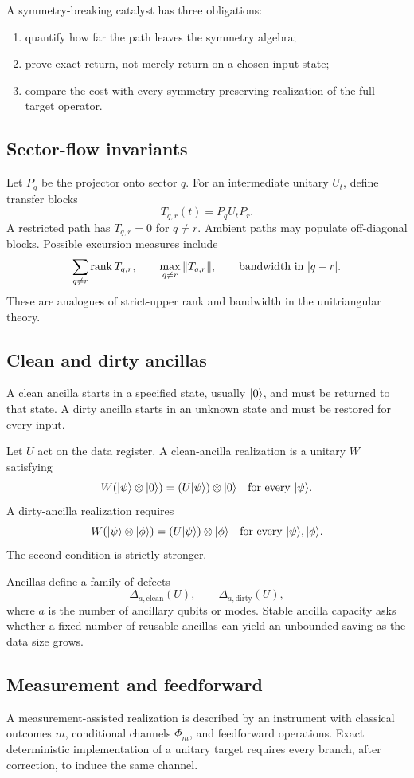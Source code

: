 \begin{skeletonbox}
A symmetry-breaking catalyst has three obligations:
\begin{enumerate}
\item quantify how far the path leaves the symmetry algebra;
\item prove exact return, not merely return on a chosen input state;
\item compare the cost with every symmetry-preserving realization of the full target operator.
\end{enumerate}
\end{skeletonbox}

\subsection{Sector-flow invariants}
Let $P_q$ be the projector onto sector $q$.  For an intermediate unitary $U_t$, define transfer blocks
\[
T_{q,r}(t)=P_q U_t P_r.
\]
A restricted path has $T_{q,r}=0$ for $q\ne r$.  Ambient paths may populate off-diagonal blocks.  Possible excursion measures include
\[
\sum_{q\ne r}\operatorname{rank} T_{q,r},
\qquad
\max_{q\ne r}\|T_{q,r}\|,
\qquad
\text{bandwidth in }|q-r|.
\]
These are analogues of strict-upper rank and bandwidth in the unitriangular theory.

\subsection{Clean and dirty ancillas}
A clean ancilla starts in a specified state, usually $\lvert 0\rangle$, and must be returned to that state.  A dirty ancilla starts in an unknown state and must be restored for every input.

Let $U$ act on the data register.  A clean-ancilla realization is a unitary $W$ satisfying
\[
W(\lvert \psi\rangle\otimes\lvert 0\rangle)
=(U\lvert \psi\rangle)\otimes\lvert 0\rangle
\quad\text{for every }\lvert \psi\rangle.
\]
A dirty-ancilla realization requires
\[
W(\lvert \psi\rangle\otimes\lvert \phi\rangle)
=(U\lvert \psi\rangle)\otimes\lvert \phi\rangle
\quad\text{for every }\lvert \psi\rangle,\lvert \phi\rangle.
\]
The second condition is strictly stronger.

Ancillas define a family of defects
\[
\Delta_{a,\mathrm{clean}}(U),
\qquad
\Delta_{a,\mathrm{dirty}}(U),
\]
where $a$ is the number of ancillary qubits or modes.  Stable ancilla capacity asks whether a fixed number of reusable ancillas can yield an unbounded saving as the data size grows.

\subsection{Measurement and feedforward}
A measurement-assisted realization is described by an instrument with classical outcomes $m$, conditional channels $\Phi_m$, and feedforward operations.  Exact deterministic implementation of a unitary target requires every branch, after correction, to induce the same channel.

